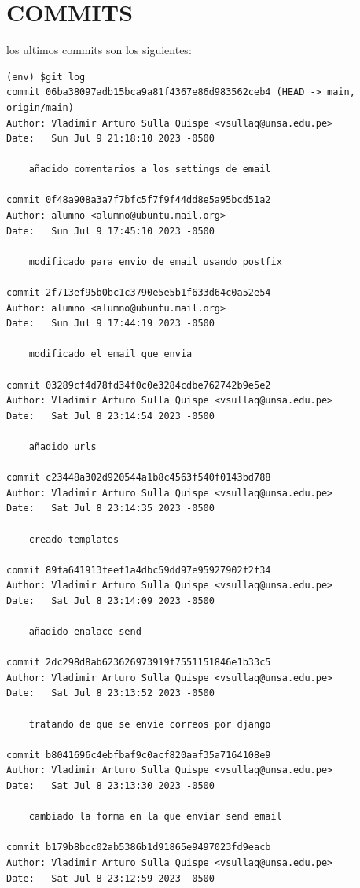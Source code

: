 \documentclass{article}
\begin{document}
\section{COMMITS}

los ultimos commits son los siguientes:

\begin{lstlisting}
(env) $git log
commit 06ba38097adb15bca9a81f4367e86d983562ceb4 (HEAD -> main, origin/main)
Author: Vladimir Arturo Sulla Quispe <vsullaq@unsa.edu.pe>
Date:   Sun Jul 9 21:18:10 2023 -0500

    añadido comentarios a los settings de email

commit 0f48a908a3a7f7bfc5f7f9f44dd8e5a95bcd51a2
Author: alumno <alumno@ubuntu.mail.org>
Date:   Sun Jul 9 17:45:10 2023 -0500

    modificado para envio de email usando postfix

commit 2f713ef95b0bc1c3790e5e5b1f633d64c0a52e54
Author: alumno <alumno@ubuntu.mail.org>
Date:   Sun Jul 9 17:44:19 2023 -0500

    modificado el email que envia

commit 03289cf4d78fd34f0c0e3284cdbe762742b9e5e2
Author: Vladimir Arturo Sulla Quispe <vsullaq@unsa.edu.pe>
Date:   Sat Jul 8 23:14:54 2023 -0500

    añadido urls

commit c23448a302d920544a1b8c4563f540f0143bd788
Author: Vladimir Arturo Sulla Quispe <vsullaq@unsa.edu.pe>
Date:   Sat Jul 8 23:14:35 2023 -0500

    creado templates

commit 89fa641913feef1a4dbc59dd97e95927902f2f34
Author: Vladimir Arturo Sulla Quispe <vsullaq@unsa.edu.pe>
Date:   Sat Jul 8 23:14:09 2023 -0500

    añadido enalace send

commit 2dc298d8ab623626973919f7551151846e1b33c5
Author: Vladimir Arturo Sulla Quispe <vsullaq@unsa.edu.pe>
Date:   Sat Jul 8 23:13:52 2023 -0500

    tratando de que se envie correos por django

commit b8041696c4ebfbaf9c0acf820aaf35a7164108e9
Author: Vladimir Arturo Sulla Quispe <vsullaq@unsa.edu.pe>
Date:   Sat Jul 8 23:13:30 2023 -0500

    cambiado la forma en la que enviar send email

commit b179b8bcc02ab5386b1d91865e9497023fd9eacb
Author: Vladimir Arturo Sulla Quispe <vsullaq@unsa.edu.pe>
Date:   Sat Jul 8 23:12:59 2023 -0500


\end{lstlisting}
\end{document}
